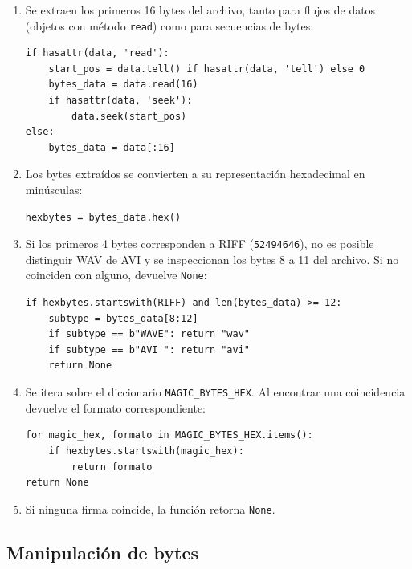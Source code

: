 \documentclass[12pt, a4paper]{article}
\begin{document}
\begin{enumerate}
    \item Se extraen los primeros 16 bytes del archivo, tanto para flujos
          de datos (objetos con método \texttt{read}) como para secuencias de bytes:

\begin{verbatim}
if hasattr(data, 'read'):
    start_pos = data.tell() if hasattr(data, 'tell') else 0
    bytes_data = data.read(16)
    if hasattr(data, 'seek'):
        data.seek(start_pos)
else:
    bytes_data = data[:16]
\end{verbatim}

    \item Los bytes extraídos se convierten a su representación hexadecimal en minúsculas:

\begin{verbatim}
hexbytes = bytes_data.hex()
\end{verbatim}

    \item Si los primeros 4 bytes corresponden a RIFF (\texttt{52494646}), no es posible
          distinguir WAV de AVI y se inspeccionan los bytes 8 a 11 del archivo. Si no coinciden con alguno, 
          devuelve \texttt{None}:

\begin{verbatim}
if hexbytes.startswith(RIFF) and len(bytes_data) >= 12:
    subtype = bytes_data[8:12]
    if subtype == b"WAVE": return "wav"
    if subtype == b"AVI ": return "avi"
    return None
\end{verbatim}

    \item Se itera sobre el diccionario \texttt{MAGIC\_BYTES\_HEX}. Al encontrar una
          coincidencia devuelve el formato correspondiente:

\begin{verbatim}
for magic_hex, formato in MAGIC_BYTES_HEX.items():
    if hexbytes.startswith(magic_hex):
        return formato
return None
\end{verbatim}

    \item Si ninguna firma coincide, la función retorna \texttt{None}.
\end{enumerate}

\subsection{Manipulación de bytes}
\end{document}
